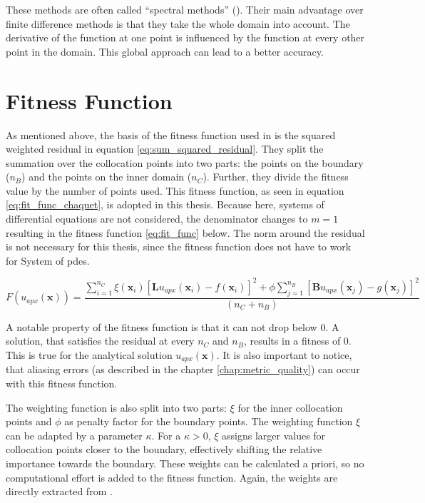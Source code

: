 \documentclass[./\jobname.tex]{subfiles}
\begin{document}
These methods are often called ``spectral methods'' (\cite{shen_spectral_2011}). Their main advantage over finite difference methods is that they take the whole domain into account. The derivative of the function at one point is influenced by the function at every other point in the domain. This global approach can lead to a better accuracy. 

\section{Fitness Function}
\label{chap:fit_func}

As mentioned above, the basis of the fitness function used in \cite{chaquet_using_2019} is the squared weighted residual in equation \eqref{eq:sum_squared_residual}. They split the summation over the collocation points into two parts: the points on the boundary ($n_B$) and the points on the inner domain ($n_C$). Further, they divide the fitness value by the number of points used. This fitness function, as seen in equation \eqref{eq:fit_func_chaquet}, is adopted in this thesis. Because here, systems of differential equations are not considered, the denominator changes to $m=1$ resulting in the fitness function \eqref{eq:fit_func} below. The norm around the residual is not necessary for this thesis, since the fitness function does not have to work for System of \gls{pde}s.

\begin{equation}
\label{eq:fit_func}
F(u_{apx}(\mathbf{x})) = \frac{\sum_{i=1}^{n_C} \xi (\mathbf{x}_i) \left[ \mathbf{L}u_{apx}(\mathbf{x}_i) - f(\mathbf{x}_i) \right]^2 + \phi \sum_{j=1}^{n_B} \left[ \mathbf{B}u_{apx}(\mathbf{x}_j) - g(\mathbf{x}_j)\right]^2}{(n_C + n_B)}  
\end{equation}

A notable property of the fitness function is that it can not drop below 0. A solution, that satisfies the residual at every $n_C$ and $n_B$, results in a fitness of 0. This is true for the analytical solution $u_{apx}(\mathbf{x})$. It is also important to notice, that aliasing errors (as described in the chapter \ref{chap:metric_quality}) can occur with this fitness function. 

The weighting function is also split into two parts: $\xi$ for the inner collocation points and $\phi$ as penalty factor for the boundary points. The weighting function $\xi$ can be adapted by a parameter $\kappa$. For a $\kappa > 0$, $\xi$ assigns larger values for collocation points closer to the boundary, effectively shifting the relative importance towards the boundary. These weights can be calculated a priori, so no computational effort is added to the fitness function. Again, the weights are directly extracted from \cite{chaquet_using_2019}. 
\end{document}
